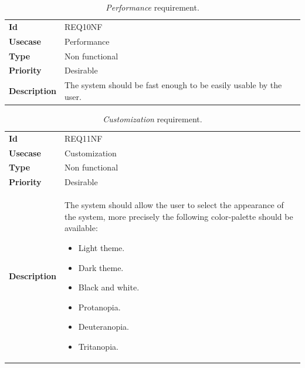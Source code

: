 \begin{table}[h!t]
    \centering
    \caption{\emph{Performance} requirement.}
    \label{tab:req:performance}
    \centering
    \begin{tabular}{l | p{80mm}}
        \textbf{Id}          & REQ10NF                                                           \\
        \textbf{Usecase}     & Performance                                                       \\
        \textbf{Type}        & Non functional                                                    \\
        \textbf{Priority}    & Desirable                                                         \\
        \textbf{Description} & The system should be fast enough to be easily usable by the user.
    \end{tabular}
\end{table}

\begin{table}[h!t]
    \centering
    \caption{\emph{Customization} requirement.}
    \label{tab:req:customization}
    \centering
    \begin{tabular}{l | p{80mm}}
        \textbf{Id}          & REQ11NF                                                                                                                                  \\
        \textbf{Usecase}     & Customization                                                                                                                            \\
        \textbf{Type}        & Non functional                                                                                                                           \\
        \textbf{Priority}    & Desirable                                                                                                                                \\
        \textbf{Description} & The system should allow the user to select the appearance of the system, more precisely the following color-palette should be available:
        \begin{itemize}
            \item Light theme.
            \item Dark theme.
            \item Black and white.
            \item Protanopia.
            \item Deuteranopia.
            \item Tritanopia.
        \end{itemize}
    \end{tabular}
\end{table}

